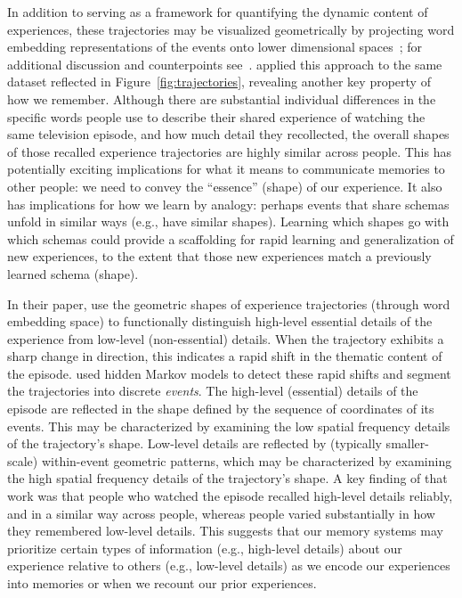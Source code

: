 \documentclass{article}
\begin{document}
In addition to serving as a framework for quantifying the dynamic content of experiences, these trajectories may be visualized geometrically by projecting word embedding representations of the events onto lower dimensional spaces~\citep[e.g., ][]{HeusEtal18a}; for additional discussion and counterpoints see~\cite{JollChan18}.  \cite{HeusEtal18c} applied this approach to the same dataset reflected in Figure~\ref{fig:trajectories}, revealing another key property of how we remember.  Although there are substantial individual differences in the specific words people use to describe their shared experience of watching the same television episode, and how much detail they recollected, the overall shapes of those recalled experience trajectories are highly similar across people.  This has potentially exciting implications for what it means to communicate memories to other people: we need to convey the ``essence'' (shape) of our experience.  It also has implications for how we learn by analogy: perhaps events that share schemas~\citep[e.g., ][]{BaldEtal18}  unfold in similar ways (e.g., have similar shapes).  Learning which shapes go with which schemas could provide a scaffolding for rapid learning and generalization of new experiences, to the extent that those new experiences match a previously learned schema (shape).

In their paper, \cite{HeusEtal18c} use the geometric shapes of experience trajectories (through word embedding space) to functionally distinguish high-level essential details of the experience from low-level (non-essential) details.  When the trajectory exhibits a sharp change in direction, this indicates a rapid shift in the thematic content of the episode.  \cite{HeusEtal18c} used hidden Markov models to detect these rapid shifts and segment the trajectories into discrete \textit{events}.  The high-level (essential) details of the episode are reflected in the shape defined by the sequence of coordinates of its events.  This may be characterized by examining the low spatial frequency details of the trajectory's shape.  Low-level details are reflected by (typically smaller-scale) within-event geometric patterns, which may be characterized by examining the high spatial frequency details of the trajectory's shape.  A key finding of that work was that people who watched the episode recalled high-level details reliably, and in a similar way across people, whereas people varied substantially in how they remembered low-level details.  This suggests that our memory systems may prioritize certain types of information (e.g., high-level details) about our experience relative to others (e.g., low-level details) as we encode our experiences into memories or when we recount our prior experiences.
\end{document}
